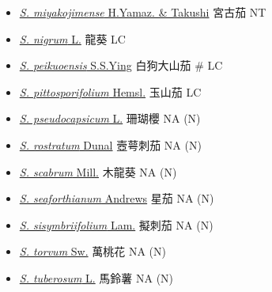\begin{itemize}
\begin{itemize}
        \item[] \href{http://www.theplantlist.org/tpl1.1/search?q=Solanum+miyakojimense}{\textit{S. miyakojimense} H.Yamaz. \& Takushi}   宮古茄   NT
        \item[] \href{http://www.theplantlist.org/tpl1.1/search?q=Solanum+nigrum}{\textit{S. nigrum} L.}   龍葵   LC
        \item[] \href{http://www.theplantlist.org/tpl1.1/search?q=Solanum+peikuoensis}{\textit{S. peikuoensis} S.S.Ying}   白狗大山茄  \# LC
        \item[] \href{http://www.theplantlist.org/tpl1.1/search?q=Solanum+pittosporifolium}{\textit{S. pittosporifolium} Hemsl.}   玉山茄   LC
        \item[] \href{http://www.theplantlist.org/tpl1.1/search?q=Solanum+pseudocapsicum}{\textit{S. pseudocapsicum} L.}   珊瑚櫻   NA (N)
        \item[] \href{http://www.theplantlist.org/tpl1.1/search?q=Solanum+rostratum}{\textit{S. rostratum} Dunal}   壼萼刺茄   NA (N)
        \item[] \href{http://www.theplantlist.org/tpl1.1/search?q=Solanum+scabrum}{\textit{S. scabrum} Mill.}   木龍葵   NA (N)
        \item[] \href{http://www.theplantlist.org/tpl1.1/search?q=Solanum+seaforthianum}{\textit{S. seaforthianum} Andrews}   星茄   NA (N)
        \item[] \href{http://www.theplantlist.org/tpl1.1/search?q=Solanum+sisymbriifolium}{\textit{S. sisymbriifolium} Lam.}   擬刺茄   NA (N)
        \item[] \href{http://www.theplantlist.org/tpl1.1/search?q=Solanum+torvum}{\textit{S. torvum} Sw.}   萬桃花   NA (N)
        \item[] \href{http://www.theplantlist.org/tpl1.1/search?q=Solanum+tuberosum}{\textit{S. tuberosum} L.}   馬鈴薯   NA (N)

\end{itemize}
\end{itemize}
